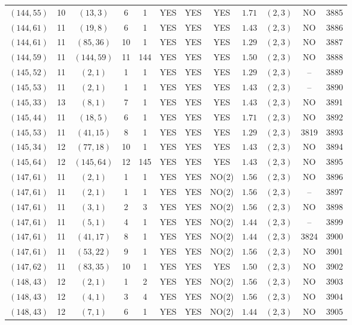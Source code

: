 \begin{longtable}{|c|c|c|c|c|c|c|c|c|c|c|c|}
$(144,55)$ & 10 & $(13,3)$ & 6 & 1 & YES & YES & YES & $1.71$ & $(2,3)$ & NO & 3885\\
$(144,61)$ & 11 & $(19,8)$ & 6 & 1 & YES & YES & YES & $1.43$ & $(2,3)$ & NO & 3886\\
$(144,61)$ & 11 & $(85,36)$ & 10 & 1 & YES & YES & YES & $1.29$ & $(2,3)$ & NO & 3887\\
$(144,59)$ & 11 & $(144,59)$ & 11 & 144 & YES & YES & YES & $1.50$ & $(2,3)$ & NO & 3888\\
$(145,52)$ & 11 & $(2,1)$ & 1 & 1 & YES & YES & YES & $1.29$ & $(2,3)$ & -- & 3889\\
$(145,53)$ & 11 & $(2,1)$ & 1 & 1 & YES & YES & YES & $1.43$ & $(2,3)$ & -- & 3890\\
$(145,33)$ & 13 & $(8,1)$ & 7 & 1 & YES & YES & YES & $1.43$ & $(2,3)$ & NO & 3891\\
$(145,44)$ & 11 & $(18,5)$ & 6 & 1 & YES & YES & YES & $1.71$ & $(2,3)$ & NO & 3892\\
$(145,53)$ & 11 & $(41,15)$ & 8 & 1 & YES & YES & YES & $1.29$ & $(2,3)$ & 3819 & 3893\\
$(145,34)$ & 12 & $(77,18)$ & 10 & 1 & YES & YES & YES & $1.43$ & $(2,3)$ & NO & 3894\\
$(145,64)$ & 12 & $(145,64)$ & 12 & 145 & YES & YES & YES & $1.43$ & $(2,3)$ & NO & 3895\\
$(147,61)$ & 11 & $(2,1)$ & 1 & 1 & YES & YES & NO(2) & $1.56$ & $(2,3)$ & NO & 3896\\
$(147,61)$ & 11 & $(2,1)$ & 1 & 1 & YES & YES & NO(2) & $1.56$ & $(2,3)$ & -- & 3897\\
$(147,61)$ & 11 & $(3,1)$ & 2 & 3 & YES & YES & NO(2) & $1.56$ & $(2,3)$ & NO & 3898\\
$(147,61)$ & 11 & $(5,1)$ & 4 & 1 & YES & YES & NO(2) & $1.44$ & $(2,3)$ & -- & 3899\\
$(147,61)$ & 11 & $(41,17)$ & 8 & 1 & YES & YES & NO(2) & $1.44$ & $(2,3)$ & 3824 & 3900\\
$(147,61)$ & 11 & $(53,22)$ & 9 & 1 & YES & YES & NO(2) & $1.56$ & $(2,3)$ & NO & 3901\\
$(147,62)$ & 11 & $(83,35)$ & 10 & 1 & YES & YES & YES & $1.50$ & $(2,3)$ & NO & 3902\\
$(148,43)$ & 12 & $(2,1)$ & 1 & 2 & YES & YES & NO(2) & $1.56$ & $(2,3)$ & NO & 3903\\
$(148,43)$ & 12 & $(4,1)$ & 3 & 4 & YES & YES & NO(2) & $1.56$ & $(2,3)$ & NO & 3904\\
$(148,43)$ & 12 & $(7,1)$ & 6 & 1 & YES & YES & NO(2) & $1.44$ & $(2,3)$ & NO & 3905\\

\end{longtable}
